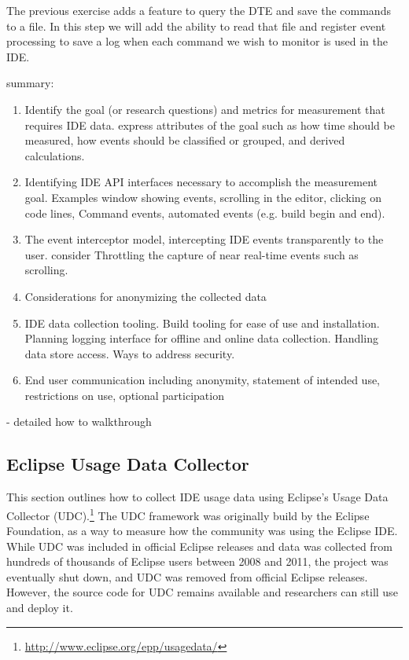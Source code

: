 \begin{Exercise}
The previous exercise adds a feature to query the DTE and save the commands to a file.  In this step we will add the ability to read that file and register event processing to save a log when each command we wish to monitor is used in the IDE.  
\end{Exercise}
 summary:
\begin{enumerate}
	\item 
	Identify the goal (or research questions) and metrics for measurement that requires IDE data.  express attributes of the goal such as how time should be measured, how events should be classified or grouped, and derived calculations.
	\item
	Identifying  IDE API interfaces necessary to accomplish the measurement goal.  Examples window showing events, scrolling in the editor, clicking on code lines, Command events, automated events (e.g. build begin and end).
	\item
	The event interceptor model, intercepting IDE events transparently to the user.  consider Throttling the capture of near real-time events such as scrolling.
	\item
	Considerations for anonymizing the collected data
	\item
	IDE data collection tooling.  Build tooling for ease of use and installation.  Planning logging interface for offline and online data collection.  Handling data store access.  Ways to address security.  
	\item
	End user communication including anonymity, statement of intended use, restrictions on use, optional participation
	
\end{enumerate}
- detailed how to walkthrough 

\subsection{Eclipse Usage Data Collector}

This section outlines how to collect IDE usage data using Eclipse's Usage Data 
Collector (UDC).\footnote{\url{http://www.eclipse.org/epp/usagedata/}}
The UDC framework was originally build by the Eclipse Foundation, as a way to measure how the 
community was using the Eclipse IDE.
While UDC was included in official Eclipse releases and data was collected from
hundreds of thousands of Eclipse users between 2008 and 2011, the project was eventually shut down, 
and UDC was removed from official Eclipse releases.
However, the source code for UDC remains available and researchers can still use and deploy it.

